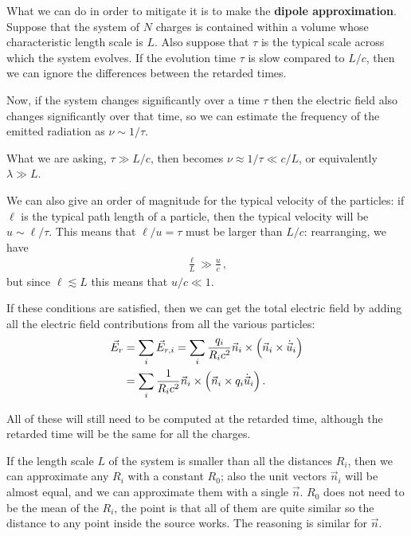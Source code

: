\documentclass[main.tex]{subfiles}
\begin{document}
What we can do in order to mitigate it is to make the \textbf{dipole approximation}. 
Suppose that the system of \(N\) charges is contained within a volume whose characteristic length scale is \(L\). 
Also suppose that \(\tau \) is the typical scale across which the system evolves. 
If the evolution time \(\tau \) is slow compared to \(L / c\), then we can ignore the differences between the retarded times. 

Now, if the system changes significantly over a time \(\tau \) then the electric field also changes significantly over that time, so we can estimate the frequency of the emitted radiation as \(\nu \sim 1/ \tau \). 

What we are asking, \(\tau \gg L / c\), then becomes \(\nu \approx 1/\tau  \ll c/ L\), or equivalently \(\lambda \gg L\). 

We can also give an order of magnitude for the typical velocity of the particles: if \(\ell\) is the typical path length of a particle, then the typical velocity will be \(u \sim \ell / \tau \).  
This means that \(\ell / u = \tau\) must be larger than \(L / c\): rearranging, we have 
%
\begin{align}
\frac{\ell}{L} \gg \frac{u}{c}
\,,
\end{align}
%
but since \(\ell \lesssim L\) this means that \(u / c \ll 1\).

If these conditions are satisfied, then we can get the total electric field by adding all the electric field contributions from all the various particles: 
%
\begin{align}
\vec{E}_r &= \sum _{i} \vec{E}_{r, i} 
= \sum _{i} \frac{q_i}{R_i c^2} \vec{n}_i \times \qty(\vec{n}_i \times \dot{\vec{u}}_i)  \\ 
&= \sum _{i} \frac{1}{R_i c^2} \vec{n}_i \times \qty(\vec{n}_i \times q_i \dot{\vec{u}}_i) 
\,.
\end{align}

All of these will still need to be computed at the retarded time, although the retarded time will be the same for all the charges. 

If the length scale \(L\) of the system is smaller than all the distances \(R_i\), then we can approximate any \(R_i\) with a constant \(R_0\); also the unit vectors \(\vec{n}_i\) will be almost equal, and we can approximate them with a single \(\vec{n}\). 
\(R_0\) does not need to be the mean of the \(R_i\), the point is that all of them are quite similar so the distance to any point inside the source works. The reasoning is similar for \(\vec{n}\). 
\end{document}
